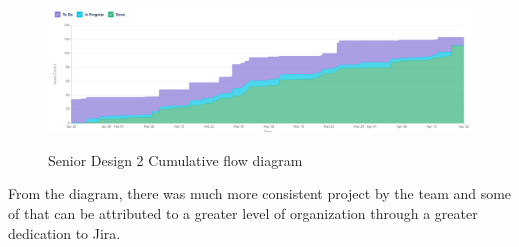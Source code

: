 \begin{figure}[H]
    \caption{Senior Design 2 Cumulative flow diagram}
    \centering
    \includegraphics[width=\textwidth]{images/Cumulative flow diagram-sd2.PNG}
    \label{fig:cumulativeflow}
\end{figure}

From the diagram, there was much more consistent project by the team and some of that can be attributed to a greater level of organization through a greater dedication to Jira.
